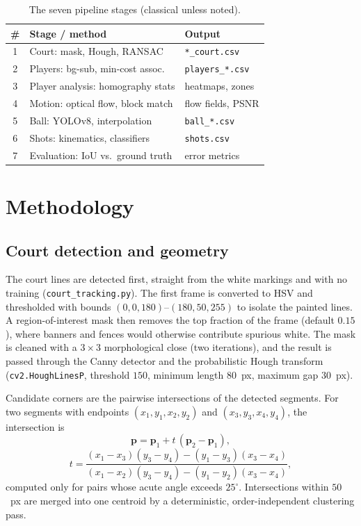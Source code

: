 \documentclass[11pt]{article}
\begin{document}
\begin{table}[t]
\centering
\caption{The seven pipeline stages (classical unless noted).}
\label{tab:stages}
\small
\begin{tabular}{@{}clp{4.0cm}@{}}
\toprule
\# & Stage / method & Output \\
\midrule
1 & Court: mask, Hough, RANSAC & \texttt{*\_court.csv} \\
2 & Players: bg-sub, min-cost assoc. & \texttt{players\_*.csv} \\
3 & Player analysis: homography stats & heatmaps, zones \\
4 & Motion: optical flow, block match & flow fields, PSNR \\
5 & Ball: YOLOv8, interpolation & \texttt{ball\_*.csv} \\
6 & Shots: kinematics, classifiers & \texttt{shots.csv} \\
7 & Evaluation: IoU vs.\ ground truth & error metrics \\
\bottomrule
\end{tabular}
\end{table}

\section{Methodology}

\subsection{Court detection and geometry}
The court lines are detected first, straight from the white markings and with no training (\texttt{court\_tracking.py}). The first frame is converted to HSV and thresholded with bounds $(0,0,180)$--$(180,50,255)$ to isolate the painted lines. A region-of-interest mask then removes the top fraction of the frame (default $0.15$), where banners and fences would otherwise contribute spurious white. The mask is cleaned with a $3\times3$ morphological close (two iterations), and the result is passed through the Canny detector and the probabilistic Hough transform (\texttt{cv2.HoughLinesP}, threshold $150$, minimum length $80$~px, maximum gap $30$~px).

Candidate corners are the pairwise intersections of the detected segments. For two segments with endpoints $(x_1,y_1,x_2,y_2)$ and $(x_3,y_3,x_4,y_4)$, the intersection is
\begin{equation}
\mathbf{p} = \mathbf{p}_1 + t\,(\mathbf{p}_2-\mathbf{p}_1),
\end{equation}
\begin{equation}
t = \frac{(x_1-x_3)(y_3-y_4)-(y_1-y_3)(x_3-x_4)}{(x_1-x_2)(y_3-y_4)-(y_1-y_2)(x_3-x_4)},
\end{equation}
computed only for pairs whose acute angle exceeds $25^\circ$. Intersections within $50$~px are merged into one centroid by a deterministic, order-independent clustering pass.
\end{document}

